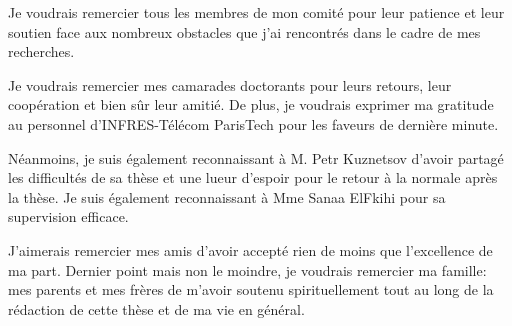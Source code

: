 \begin{remerciements}
Je voudrais remercier tous les membres de mon comité pour leur patience et leur soutien face aux nombreux obstacles que j'ai rencontrés dans le cadre de mes recherches.

Je voudrais remercier mes camarades doctorants pour leurs retours, leur coopération et bien sûr leur amitié. De plus, je voudrais exprimer ma gratitude au personnel d’INFRES-Télécom ParisTech pour les faveurs de dernière minute.

Néanmoins, je suis également reconnaissant à M. Petr Kuznetsov d’avoir partagé les difficultés de sa thèse et une lueur d’espoir pour le retour à la normale après la thèse. Je suis également reconnaissant à Mme Sanaa ElFkihi pour sa supervision efficace.

J'aimerais remercier mes amis d'avoir accepté rien de moins que l'excellence de ma part. Dernier point mais non le moindre, je voudrais remercier ma famille: mes parents et mes frères de m'avoir soutenu spirituellement tout au long de la rédaction de cette thèse et de ma vie en général.
\end{remerciements}